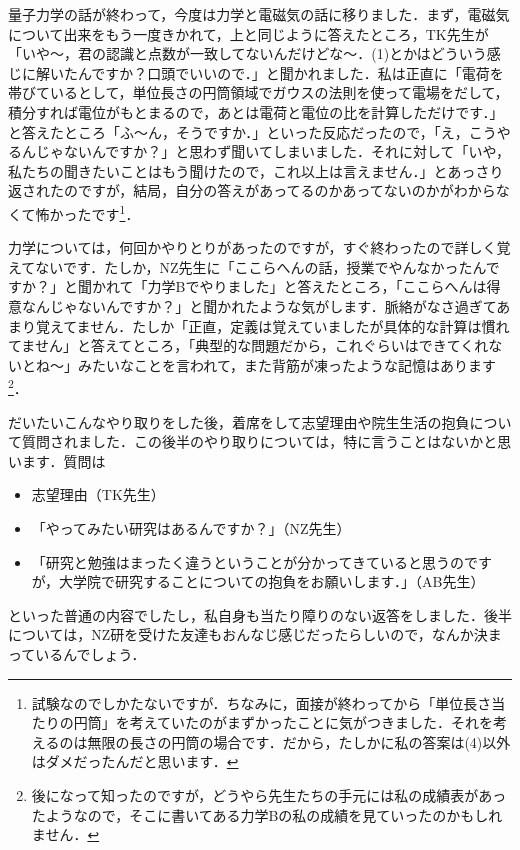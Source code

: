 \documentclass[a4paper,pdflatex,ja=standard]{bxjsarticle}
\begin{document}
量子力学の話が終わって，今度は力学と電磁気の話に移りました．まず，電磁気について出来をもう一度きかれて，上と同じように答えたところ，TK先生が「いや～，君の認識と点数が一致してないんだけどな～．(1)とかはどういう感じに解いたんですか？口頭でいいので．」と聞かれました．私は正直に「電荷を帯びているとして，単位長さの円筒領域でガウスの法則を使って電場をだして，積分すれば電位がもとまるので，あとは電荷と電位の比を計算しただけです．」と答えたところ「ふ～ん，そうですか．」といった反応だったので，「え，こうやるんじゃないんですか？」と思わず聞いてしまいました．それに対して「いや，私たちの聞きたいことはもう聞けたので，これ以上は言えません．」とあっさり返されたのですが，結局，自分の答えがあってるのかあってないのかがわからなくて怖かったです\footnote{試験なのでしかたないですが．ちなみに，面接が終わってから「単位長さ当たりの円筒」を考えていたのがまずかったことに気がつきました．それを考えるのは無限の長さの円筒の場合です．だから，たしかに私の答案は(4)以外はダメだったんだと思います．
}．

力学については，何回かやりとりがあったのですが，すぐ終わったので詳しく覚えてないです．たしか，NZ先生に「ここらへんの話，授業でやんなかったんですか？」と聞かれて「力学Bでやりました」と答えたところ，「ここらへんは得意なんじゃないんですか？」と聞かれたような気がします．脈絡がなさ過ぎてあまり覚えてません．たしか「正直，定義は覚えていましたが具体的な計算は慣れてません」と答えてところ，「典型的な問題だから，これぐらいはできてくれないとね～」みたいなことを言われて，また背筋が凍ったような記憶はあります\footnote{
  後になって知ったのですが，どうやら先生たちの手元には私の成績表があったようなので，そこに書いてある力学Bの私の成績を見ていったのかもしれません．
}．

だいたいこんなやり取りをした後，着席をして志望理由や院生生活の抱負について質問されました．この後半のやり取りについては，特に言うことはないかと思います．質問は
\begin{itemize}
  \item 
  志望理由（TK先生）
  
  \item 
  「やってみたい研究はあるんですか？」（NZ先生）

  \item 
  「研究と勉強はまったく違うということが分かってきていると思うのですが，大学院で研究することについての抱負をお願いします．」（AB先生）
\end{itemize}
といった普通の内容でしたし，私自身も当たり障りのない返答をしました．後半については，NZ研を受けた友達もおんなじ感じだったらしいので，なんか決まっているんでしょう．
\end{document}

